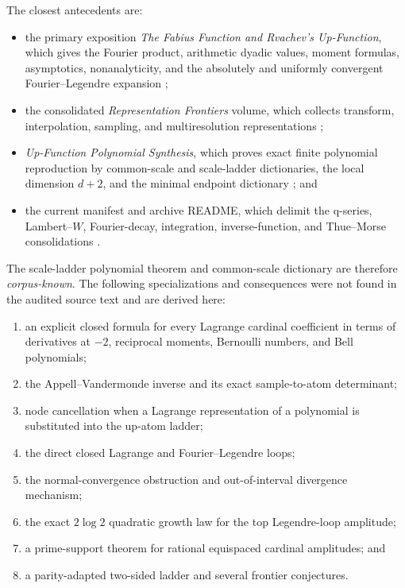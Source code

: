 \documentclass[11pt,oneside]{article}
\theoremstyle{definition}
\theoremstyle{remark}
\begin{document}
The closest antecedents are:

\begin{itemize}
\item the primary exposition
\emph{The Fabius Function and Rvachev's Up-Function}, which gives the
Fourier product, arithmetic dyadic values, moment formulas, asymptotics,
nonanalyticity, and the absolutely and uniformly convergent
Fourier--Legendre expansion \cite{ReshetnikovPrimary};
\item the consolidated \emph{Representation Frontiers} volume, which
collects transform, interpolation, sampling, and multiresolution
representations \cite{RepresentationFrontiers};
\item \emph{Up-Function Polynomial Synthesis}, which proves exact finite
polynomial reproduction by common-scale and scale-ladder dictionaries,
the local dimension $d+2$, and the minimal endpoint dictionary
\cite{UpPolynomialSynthesis}; and
\item the current manifest and archive README, which delimit the q-series,
Lambert--$W$, Fourier-decay, integration, inverse-function, and
Thue--Morse consolidations \cite{DraftManifest,ArchiveReadme}.
\end{itemize}

The scale-ladder polynomial theorem and common-scale dictionary are therefore
\emph{corpus-known}.  The following specializations and consequences were
not found in the audited source text and are derived here:

\begin{enumerate}
\item an explicit closed formula for every Lagrange cardinal coefficient in
terms of derivatives at $-2$, reciprocal moments, Bernoulli numbers, and Bell
polynomials;
\item the Appell--Vandermonde inverse and its exact sample-to-atom
determinant;
\item node cancellation when a Lagrange representation of a polynomial is
substituted into the up-atom ladder;
\item the direct closed Lagrange and Fourier--Legendre loops;
\item the normal-convergence obstruction and out-of-interval divergence
mechanism;
\item the exact $2\log2$ quadratic growth law for the top Legendre-loop
amplitude;
\item a prime-support theorem for rational equispaced cardinal amplitudes;
and
\item a parity-adapted two-sided ladder and several frontier conjectures.
\end{enumerate}
\end{document}

